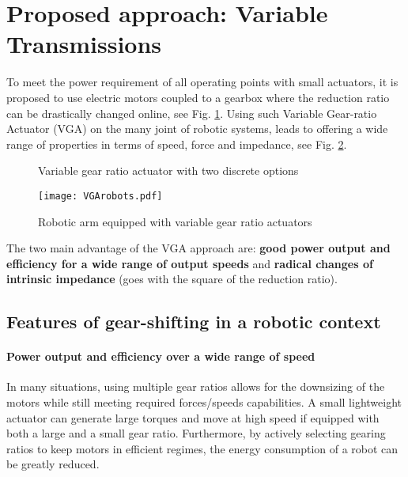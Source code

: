 \section{Proposed approach: Variable Transmissions}
\label{sec:ProposedSolutionRobotsUsingMultipleGearRatioActuators}

To meet the power requirement of all operating points with small actuators, it is proposed to use electric motors coupled to a gearbox where the reduction ratio can be drastically changed online, see Fig. \ref{fig:2s}. Using such Variable Gear-ratio Actuator (VGA) on the many joint of robotic systems, leads to offering a wide range of properties in terms of speed, force and impedance, see Fig. \ref{fig:vgarobots}.

\begin{figure}[htb]
        \centering
        \caption{Variable gear ratio actuator with two discrete options}\label{fig:2s}
\end{figure}

\begin{figure}[htb]
        \centering
				\texttt{[image: VGArobots.pdf]}
        \caption{Robotic arm equipped with variable gear ratio actuators}\label{fig:vgarobots}
\end{figure}

The two main advantage of the VGA approach are: \textbf{good power output and efficiency for a wide range of output speeds} and \textbf{radical changes of intrinsic impedance} (goes with the square of the reduction ratio). 

\subsection{Features of gear-shifting in a robotic context}

\paragraph{Power output and efficiency over a wide range of speed}
In many situations, using multiple gear ratios allows for the downsizing of the motors while still meeting required forces/speeds capabilities. A small lightweight actuator can generate large torques and move at high speed if equipped with both a large and a small gear ratio. Furthermore, by actively selecting gearing ratios to keep motors in efficient regimes, the energy consumption of a robot can be greatly reduced. 

